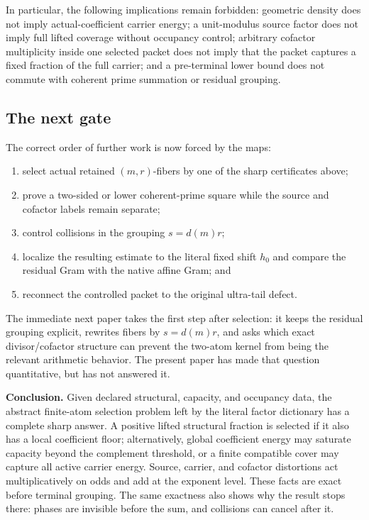 In particular, the following implications remain forbidden:
geometric density does not imply actual-coefficient carrier energy; a unit-modulus source
factor does not imply full lifted coverage without occupancy control;
arbitrary cofactor multiplicity inside one selected packet does not imply
that the packet captures a fixed fraction of the full carrier; and a
pre-terminal lower bound does not commute with coherent prime summation or
residual grouping.

\subsection{The next gate}

The correct order of further work is now forced by the maps:
\begin{enumerate}[leftmargin=2.2em]
 \item select actual retained \((m,r)\)-fibers by one of the sharp
       certificates above;
 \item prove a two-sided or lower coherent-prime square while the source
       and cofactor labels remain separate;
 \item control collisions in the grouping \(s=d(m)r\);
 \item localize the resulting estimate to the literal fixed shift \(h_0\)
       and compare the residual Gram with the native affine Gram; and
 \item reconnect the controlled packet to the original ultra-tail defect.
\end{enumerate}

The immediate next paper takes the first step after selection: it keeps
the residual grouping explicit, rewrites fibers by \(s=d(m)r\), and asks
which exact divisor/cofactor structure can prevent the two-atom kernel
from being the relevant arithmetic behavior.  The present paper has made
that question quantitative, but has not answered it.

\medskip
\noindent\textbf{Conclusion.}
Given declared structural, capacity, and occupancy data, the abstract
finite-atom selection problem left by the literal factor dictionary has a
complete sharp answer.  A positive lifted structural fraction is selected
if it also has a local coefficient floor; alternatively, global
coefficient energy may saturate capacity beyond the complement threshold,
or a finite compatible cover may capture all active carrier energy.
Source, carrier, and cofactor distortions act multiplicatively on odds and
add at the exponent level.  These facts are exact before terminal
grouping.  The same exactness also shows why the result stops there: phases
are invisible before the sum, and collisions can cancel after it.
